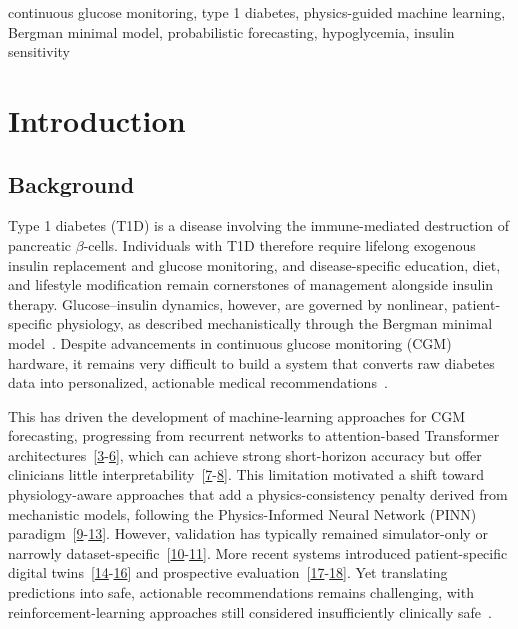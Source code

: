 \documentclass[journal]{IEEEtran}
\begin{document}
\begin{IEEEkeywords}
continuous glucose monitoring, type 1 diabetes, physics-guided machine learning, Bergman minimal model, probabilistic forecasting, hypoglycemia, insulin sensitivity
\end{IEEEkeywords}

\section{Introduction}

\subsection{Background}

Type 1 diabetes (T1D) is a disease involving the immune-mediated destruction of pancreatic $\beta$-cells. Individuals with T1D therefore require lifelong exogenous insulin replacement and glucose monitoring, and disease-specific education, diet, and lifestyle modification remain cornerstones of management alongside insulin therapy. Glucose--insulin dynamics, however, are governed by nonlinear, patient-specific physiology, as described mechanistically through the Bergman minimal model~\cite{ref1}. Despite advancements in continuous glucose monitoring (CGM) hardware, it remains very difficult to build a system that converts raw diabetes data into personalized, actionable medical recommendations~\cite{ref2}.

This has driven the development of machine-learning approaches for CGM forecasting, progressing from recurrent networks to attention-based Transformer architectures~[\hyperref[ref19label]{3}-\hyperref[ref22label]{6}], which can achieve strong short-horizon accuracy but offer clinicians little interpretability~[\hyperref[ref3label]{7}-\hyperref[ref5label]{8}]. This limitation motivated a shift toward physiology-aware approaches that add a physics-consistency penalty derived from mechanistic models, following the Physics-Informed Neural Network (PINN) paradigm~[\hyperref[ref8label]{9}-\hyperref[ref12label]{13}]. However, validation has typically remained simulator-only or narrowly dataset-specific~[\hyperref[ref9label]{10}-\hyperref[ref10label]{11}]. More recent systems introduced patient-specific digital twins~[\hyperref[ref13label]{14}-\hyperref[ref16label]{16}] and prospective evaluation~[\hyperref[ref17label]{17}-\hyperref[ref18label]{18}]. Yet translating predictions into safe, actionable recommendations remains challenging, with reinforcement-learning approaches still considered insufficiently clinically safe~\cite{ref6}.
\end{document}
